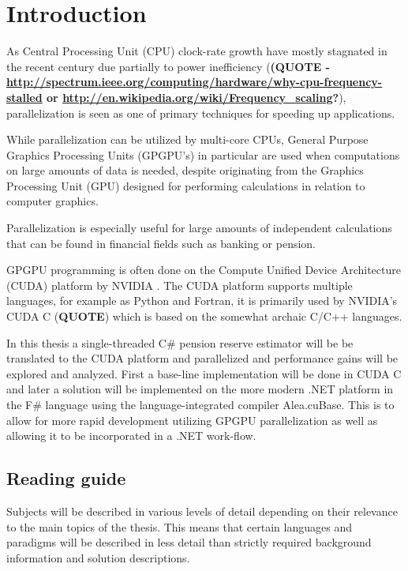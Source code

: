\section{Introduction}
As Central Processing Unit (CPU) clock-rate growth have mostly stagnated in the recent century due partially to power inefficiency (\textbf{(QUOTE - \url{http://spectrum.ieee.org/computing/hardware/why-cpu-frequency-stalled} or \url{http://en.wikipedia.org/wiki/Frequency_scaling}?}), parallelization is seen as one of primary techniques for speeding up applications.

While parallelization can be utilized by multi-core CPUs, General Purpose Graphics Processing Units (GPGPU's) in particular are used when computations on large amounts of data is needed, despite originating from the Graphics Processing Unit (GPU) designed for performing calculations in relation to computer graphics.

Parallelization is especially useful for large amounts of independent calculations that can be found in financial fields such as banking or pension.

GPGPU programming is often done on the Compute Unified Device Architecture (CUDA) platform by NVIDIA \cite{NVIDIA}. 
The CUDA platform supports multiple languages, for example as Python and Fortran, it is primarily used by NVIDIA's CUDA C (\textbf{QUOTE}) which is based on the somewhat archaic C/C++ languages.

In this thesis a single-threaded C\# pension reserve estimator will be be translated to the CUDA platform and parallelized and performance gains will be explored and analyzed.
First a base-line implementation will be done in CUDA C and later a solution will be implemented on the more modern .NET platform in the F\# language using the language-integrated compiler Alea.cuBase.
This is to allow for more rapid development utilizing GPGPU parallelization as well as allowing it to be incorporated in a .NET work-flow.


\subsection{Reading guide}
Subjects will be described in various levels of detail depending on their relevance to the main topics of the thesis.
This means that certain languages and paradigms will be described in less detail than strictly required background information and solution descriptions.

